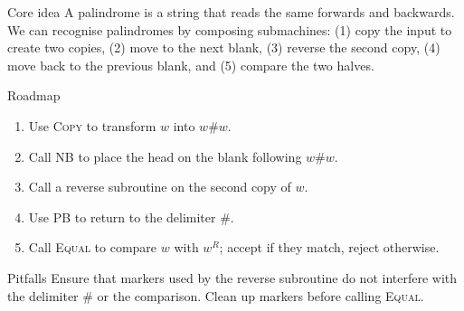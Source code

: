 \begin{frame}[t]{}
  \begin{tblock}{Core idea}
    A palindrome is a string that reads the same forwards and backwards.
    We can recognise palindromes by composing submachines: (1) copy
    the input to create two copies, (2) move to the next blank, (3)
    reverse the second copy, (4) move back to the previous blank, and
    (5) compare the two halves.
  \end{tblock}
  \begin{tblock}{Roadmap}
    \begin{enumerate}
      \item Use \textsc{Copy} to transform $w$ into $w\#w$.
      \item Call \textsc{NB} to place the head on the blank following
        $w\#w$.
      \item Call a reverse subroutine on the second copy of $w$.
      \item Use \textsc{PB} to return to the delimiter $\#$.
      \item Call \textsc{Equal} to compare $w$ with $w^R$; accept if
        they match, reject otherwise.
    \end{enumerate}
  \end{tblock}
  \begin{talert}{Pitfalls}
    Ensure that markers used by the reverse subroutine do not interfere
    with the delimiter $\#$ or the comparison.  Clean up markers
    before calling \textsc{Equal}.
  \end{talert}
  \label{fr:7.4-09}
\end{frame}

